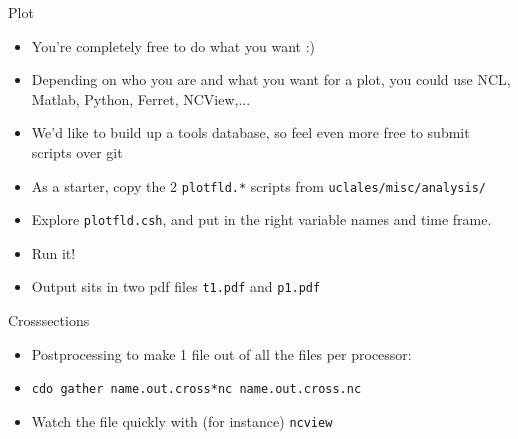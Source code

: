 \documentclass[handout]{beamer}
\newcommand{\code}[1]{{\tt #1}}
\begin{document}
\begin{frame}{Plot}
 \begin{itemize}
  \item You're completely free to do what you want :)
  \item Depending on who you are and what you want for a plot, you could use NCL, Matlab, Python, Ferret, NCView,...
  \item We'd like to build up a tools database, so feel even more free to submit scripts over git
  \item As a starter, copy the 2 \code{plotfld.*} scripts from \code{uclales/misc/analysis/}
  \item Explore \code{plotfld.csh}, and put in the right variable names and time frame.
  \item Run it!
  \item Output sits in two pdf files \code{t1.pdf} and \code{p1.pdf}
 \end{itemize}
\end{frame}

\begin{frame}{Crosssections}
\begin{itemize}
 \item Postprocessing to make 1 file out of all the files per processor:
\item \code{cdo gather name.out.cross*nc name.out.cross.nc}
\item Watch the file quickly with (for instance) \code{ncview}
\end{itemize}
\end{frame}
\end{document}
